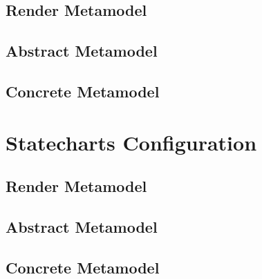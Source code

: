 \subsection*{Render Metamodel}


\subsection*{Abstract Metamodel}


\subsection*{Concrete Metamodel}
\raggedbottom



\section{Statecharts Configuration}
\label{app:state}
\subsection*{Render Metamodel}


\subsection*{Abstract Metamodel}


\subsection*{Concrete Metamodel}




